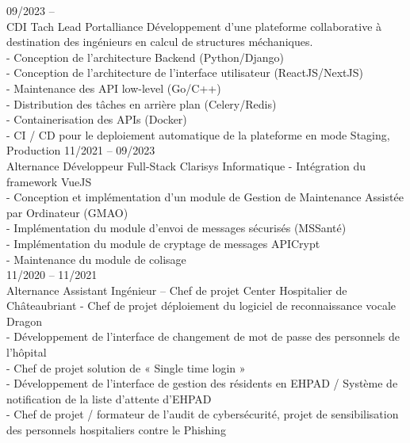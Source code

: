 \documentclass[9pt]{developercv} %
\begin{document}
\begin{entrylist}
	\entry
		{09/2023 --\\\footnotesize{CDI}}
		{Tach Lead}
		{Portalliance}
		{Développement d'une plateforme collaborative à destination des ingénieurs en calcul de structures méchaniques.\\
		- Conception de l'architecture Backend (Python/Django)\\
		- Conception de l'architecture de l'interface utilisateur (ReactJS/NextJS)\\
		- Maintenance des API low-level (Go/C++)\\
		- Distribution des tâches en arrière plan (Celery/Redis)\\
		- Containerisation des APIs (Docker)\\
		- CI / CD pour le deploiement automatique de la plateforme en mode Staging, Production
		}
	\entry
		{11/2021 -- 09/2023\\\footnotesize{Alternance}}
		{Développeur Full-Stack}
		{Clarisys Informatique}
		{
			- Intégration du framework VueJS\\
			- Conception et implémentation d’un module de
			Gestion de Maintenance Assistée par Ordinateur
			(GMAO)\\
			- Implémentation du module d’envoi de messages
			sécurisés (MSSanté)\\
			- Implémentation du module de cryptage de messages
			APICrypt\\
			- Maintenance du module de colisage\\
		}
	\entry
		{11/2020 -- 11/2021\\\footnotesize{Alternance}}
		{Assistant Ingénieur – Chef de projet}
		{Center Hospitalier de Châteaubriant}
		{
			- Chef de projet déploiement du logiciel de
			reconnaissance vocale Dragon\\
			- Développement de l’interface de changement de mot
			de passe des personnels de l'hôpital\\
			- Chef de projet solution de « Single time login »\\
			- Développement de l’interface de gestion des résidents
			en EHPAD / Système de notification de la liste
			d’attente d’EHPAD\\
			- Chef de projet / formateur de l’audit de cybersécurité,
			projet de sensibilisation des personnels hospitaliers contre le Phishing
			}
\end{entrylist}

\end{document}
